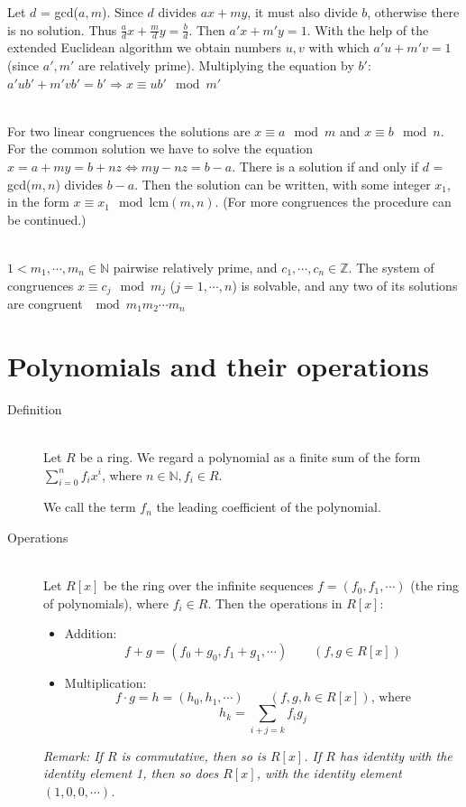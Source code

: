 \documentclass[margin=0px]{article}
\newcommand{\N}{\mathbb{N}}
\newcommand{\Z}{\mathbb{Z}}
\begin{document}
\begin{description}
        Let $d$ = gcd($a,m$). Since $d$ divides $ax+my$, it must also divide $b$, otherwise there is no solution. Thus $\frac{a}{d}x+\frac{m}{d}y = \frac{b}{d}$. Then $a'x+m'y = 1$. With the help of the extended Euclidean algorithm we obtain numbers $u,v$ with which $a'u+m'v = 1$ (since $a', m'$ are relatively prime). Multiplying the equation by $b'$: $a'ub'+m'vb' = b' \Rightarrow x \equiv ub' \mod{m'}$
    \item[Solving a system of linear congruences] \hfill \\
        For two linear congruences the solutions are $x \equiv a \mod{m}$ and $x \equiv b \mod{n}$. For the common solution we have to solve the equation $x = a + my = b+ nz \Leftrightarrow my-nz = b-a$. There is a solution if and only if $d$ = gcd($m,n$) divides $b-a$. Then the solution can be written, with some integer $x_1$, in the form ${ x \equiv x_1 \mod{\textrm{lcm}(m,n)}}$. (For more congruences the procedure can be continued.)
    \item[Chinese remainder theorem] \hfill \\
        $1 < m_1,\cdots,m_n \in\N$ pairwise relatively prime, and $c_1,\cdots,c_n \in\Z$. The system of congruences $x \equiv c_j \mod{m_j}$ ($j=1,\cdots,n$) is solvable, and any two of its solutions are congruent $\mod{m_1m_2\cdots m_n}$
\end{description}
\section{Polynomials and their operations}
\begin{description}
    \item[Definition] \hfill \\
        Let $R$ be a ring. We regard a polynomial as a finite sum of the form $\sum_{i=0}^{n} f_ix^i$, where $n\in\N, f_i \in R$.

        We call the term $f_n$ the leading coefficient of the polynomial.
    \item[Operations] \hfill \\
        Let $R[x]$ be the ring over the infinite sequences $f = (f_0, f_1, \cdots)$ (the ring of polynomials), where $f_i \in R$. Then the operations in $R[x]$:
        \begin{itemize}
            \item Addition: \\
                  \[f+g = (f_0+g_0, f_1+g_1,\cdots)\qquad (f,g \in R[x]) \]
            \item Multiplication: \\
                  \[f\cdot g = h = (h_0,h_1, \cdots) \qquad (f,g,h \in R[x]) \text{, where} \]
                  \[h_k = \sum\limits_{i+j = k}f_ig_j\]
        \end{itemize}

        \textit{Remark: If $R$ is commutative, then so is $R[x]$. If $R$ has identity with the identity element 1, then so does $R[x]$, with the identity element $(1,0,0, \cdots)$.}
\end{description}
\end{document}
